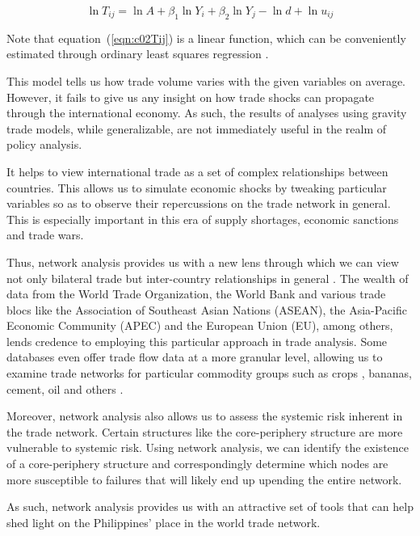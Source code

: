 \documentclass[12pt,letterpaper]{report}
\begin{document}
\begin{equation}
\label{eqn:c02Tij} \ln T_{ij} = \ln A + \beta_1 \ln Y_i + \beta_2 \ln Y_j - \ln d + \ln u_{ij}
\end{equation}

	Note that equation~(\ref{eqn:c02Tij}) is a linear function, which can be conveniently estimated through ordinary least squares regression \cite{reinert2011introduction}.
	
	This model tells us how trade volume varies with the given variables on average. However, it fails to give us any insight on how trade shocks can propagate through the international economy. As such, the results of analyses using gravity trade models, while generalizable, are not immediately useful in the realm of policy analysis.
	
	It helps to view international trade as a set of complex relationships between countries. This allows us to simulate economic shocks by tweaking particular variables so as to observe their repercussions on the trade network in general. This is especially important in this era of supply shortages, economic sanctions and trade wars. 
	
	Thus, network analysis provides us with a new lens through which we can view not only bilateral trade but inter-country relationships in general \cite{bowen1998applied}. The wealth of data from the World Trade Organization, the World Bank and various trade blocs like the Association of Southeast Asian Nations (ASEAN), the Asia-Pacific Economic Community (APEC) and the European Union (EU), among others, lends credence to employing this particular approach in trade analysis. Some databases even offer trade flow data at a more granular level, allowing us to examine trade networks for particular commodity groups such as crops \cite{burkholz2019international}, bananas, cement, oil and others \cite{de2014network}. 
	
	Moreover, network analysis also allows us to assess the systemic risk inherent in the trade network. Certain structures like the core-periphery structure are more vulnerable to systemic risk. Using network analysis, we can identify the existence of a core-periphery structure and correspondingly determine which nodes are more susceptible to failures that will likely end up upending the entire network.
	
	As such, network analysis provides us with an attractive set of tools that can help shed light on the Philippines’ place in the world trade network.
	 
\end{document}
